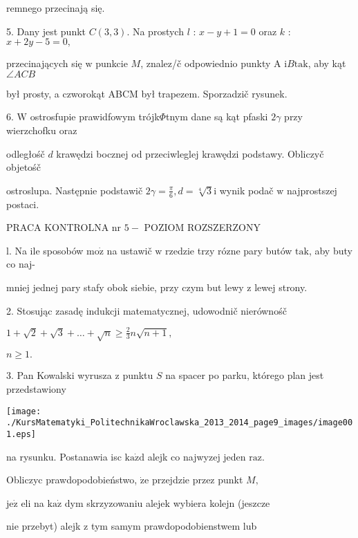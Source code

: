 \documentclass[a4paper,12pt]{article}
\begin{document}
remnego przecinają się.

5. Dany jest punkt $C(3,3)$. Na prostych $l$ : $x-y+1 = 0$ oraz $k$ : $x+2y-5 = 0,$

przecinających się $\mathrm{w}$ punkcie $M$, znalez/č odpowiednio punkty A $\mathrm{i}B\mathrm{t}\mathrm{a}\mathrm{k}$, aby kąt $\angle ACB$

był prosty, a czworokąt ABCM był trapezem. Sporzadzič rysunek.

6. $\mathrm{W}$ ostrosfupie prawidfowym trójk$\Phi$tnym dane są kąt pfaski $ 2\gamma$ przy wierzchofku oraz

odległośč $d$ krawędzi bocznej od przeciwleglej krawędzi podstawy. Obliczyč objetośč

ostroslupa. Następnie podstawič $2\displaystyle \gamma=\frac{\pi}{6}, d=\sqrt[4]{3} \mathrm{i}$ wynik podač $\mathrm{w}$ najprostszej postaci.





PRACA KONTROLNA nr $5 -$ POZIOM ROZSZERZONY

l. Na ile sposobów $\mathrm{m}\mathrm{o}\dot{\mathrm{z}}$ na ustawič $\mathrm{w}$ rzedzie trzy rózne pary butów $\mathrm{t}\mathrm{a}\mathrm{k}$, aby buty co naj-

mniej jednej pary stafy obok siebie, przy czym but lewy $\mathrm{z}$ lewej strony.

2. Stosując zasadę indukcji matematycznej, udowodnič nierównośč

$1+\displaystyle \sqrt{2}+\sqrt{3}+\ldots+\sqrt{n}\geq\frac{2}{3}n\sqrt{n+1},$

$n\geq 1.$

3. Pan Kowalski wyrusza $\mathrm{z}$ punktu $S$ na spacer po parku, którego plan jest przedstawiony
\begin{center}
\texttt{[image: ./KursMatematyki\_PolitechnikaWroclawska\_2013\_2014\_page9\_images/image001.eps]}
\end{center}
na rysunku. Postanawia isc $\mathrm{k}\mathrm{a}\dot{\mathrm{z}}\mathrm{d}$ alejk co najwyzej jeden $\mathrm{r}\mathrm{a}\mathrm{z}.$

Obliczyc prawdopodobieństwo, $\dot{\mathrm{z}}\mathrm{e}$ przejdzie przez punkt $M,$

$\mathrm{j}\mathrm{e}\dot{\mathrm{z}}$ eli na $\mathrm{k}\mathrm{a}\dot{\mathrm{z}}$ dym skrzyzowaniu alejek wybiera kolejn (jeszcze

nie przebyt) alejk $\mathrm{z}$ tym samym prawdopodobienstwem lub
\end{document}
